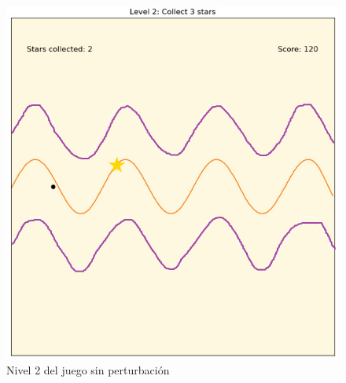 \begin{figure}[ht!]
	\centering
	\begin{minipage}{0.65\linewidth}
		\centering
		\includegraphics[width=\linewidth]{figs/flappy_level2.png}
	\end{minipage}
	\caption[Nivel 2 del juego sin perturbación]{Nivel 2 del juego sin perturbación}
	\label{fig:level2}
\end{figure}

